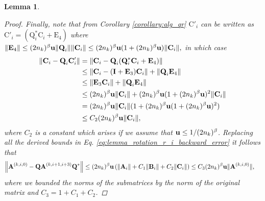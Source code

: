 \documentclass{article}
\newcommand{\lnorm}{\left\|}
\newcommand{\rnorm}{\right\|}
\newcommand{\lpar}{\left(}
\newcommand{\rpar}{\right)}
\newtheorem{lemma}{Lemma}[section]
\newcommand\matA{\boldsymbol{\mathrm{A}}}
\newcommand\matB{\boldsymbol{\mathrm{B}}}
\newcommand\matC{\boldsymbol{\mathrm{C}}}
\newcommand\matE{\boldsymbol{\mathrm{E}}}
\newcommand\matI{\boldsymbol{\mathrm{I}}}
\newcommand\matQ{\boldsymbol{\mathrm{Q}}}
\newcommand{\umach}{\textbf{\textup{u}}}
\newcommand{\cmm}{\beta}
\begin{document}
\begin{lemma}
\begin{proof}
        Finally, note that from Corollary \ref{corollary:alg_qr} $\matC'_i$ can be written as $\matC'_i=(\matQ_i^*\matC_i+\matE_4)$ where $\|\matE_{4}\|\leq (2n_k)^{\cmm}\umach\|\matQ_i\|\|\matC_i\|\leq (2n_k)^{\cmm}\umach(1+(2n_k)^{\cmm}\umach)\|\matC_i\|,$ in which case
        \begin{align*}
            \|\matC_i-\matQ_i\matC_i'\|
            &=
            \|\matC_i-\matQ_i(\matQ_i^*\matC_i+\matE_4)\|
            \\
            &\leq
            \|\matC_i-(\matI+\matE_3)\matC_i\|+\|\matQ_i\matE_4\|
            \\
            &\leq
            \|\matE_3\matC_i\|+\|\matQ_i\matE_4\|
            \\
            &\leq
            (2n_k)^{\cmm}\umach\|\matC_i\|+(2n_k)^{\cmm}\umach(1+(2n_k)^{\cmm}\umach)^2\|\matC_i\|
            \\
            &=
            (2n_k)^{\cmm}\umach\|\matC_i\|(1+(2n_k)^{\cmm}\umach(1+(2n_k)^{\cmm}\umach)^2)
            \\
            &\leq
            C_2(2n_k)^{\cmm}\umach\|\matC_i\|,
        \end{align*}
        where $C_2$ is a constant which arises if we assume that $\umach\leq 1/(2n_k)^{\cmm}$.
        Replacing all the derived bounds in Eq. \eqref{eq:lemma_rotation_r_i_backward_error} it follows that
        \begin{align*}
            \lnorm \matA^{(k,i,0)} - \matQ\matA^{(k,i+1,i+3)} \matQ^* \rnorm
            &\leq
            (2n_k)^{\cmm}\umach\lpar \|\matA_i\| + C_1\|\matB_i\| + C_2 \|\matC_i\|\rpar
            \leq
            C_3(2n_k)^{\cmm}\umach \|\matA^{(k,i,0)}\|,
        \end{align*}
        where we bounded the norms of the submatrices by the norm of the original matrix and $C_3=1+C_1+C_2$.
    \end{proof}
\end{lemma}
\end{document}
